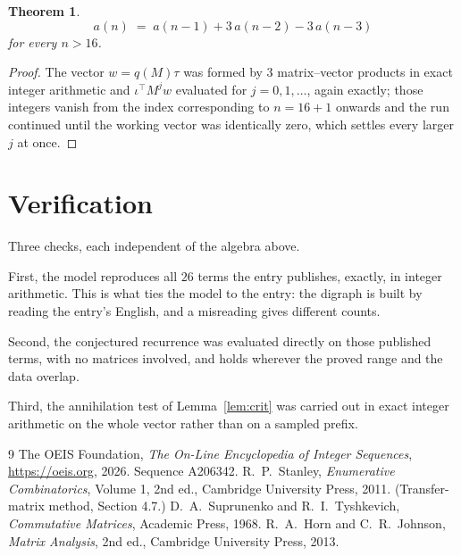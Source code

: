 \documentclass[11pt,a4paper]{article}
\theoremstyle{plain}
\newtheorem{theorem}{Theorem}
\theoremstyle{definition}
\begin{document}
\begin{theorem}
\[
a(n)\;=\;a(n-1) + 3\,a(n-2) - 3\,a(n-3)
\]
for every $n>16$.
\end{theorem}

\begin{proof}
The vector $w=q(M)\tau$ was formed by $3$ matrix--vector products in exact integer
arithmetic and $\iota^{\!\top}M^{j}w$ evaluated for $j=0,1,\dots$, again exactly; those
integers vanish from the index corresponding to $n=16+1$ onwards and the run continued
until the working vector was identically zero, which settles every larger $j$ at once.
\end{proof}

\section{Verification}

Three checks, each independent of the algebra above.

First, the model reproduces all $26$ terms the entry publishes, exactly, in integer
arithmetic. This is what ties the model to the entry: the digraph is built by reading the
entry's English, and a misreading gives different counts.

Second, the conjectured recurrence was evaluated directly on those published terms, with no
matrices involved, and holds wherever the proved range and the data overlap.

Third, the annihilation test of Lemma~\ref{lem:crit} was carried out in exact integer
arithmetic on the whole vector rather than on a sampled prefix.

\begin{thebibliography}{9}
 The OEIS Foundation, \emph{The On-Line Encyclopedia of Integer
Sequences}, \url{https://oeis.org}, 2026. Sequence A206342.
 R.~P.~Stanley, \emph{Enumerative Combinatorics}, Volume 1, 2nd ed.,
Cambridge University Press, 2011. (Transfer-matrix method, Section 4.7.)
 D.~A.~Suprunenko and R.~I.~Tyshkevich, \emph{Commutative Matrices},
Academic Press, 1968.
 R.~A.~Horn and C.~R.~Johnson, \emph{Matrix Analysis}, 2nd ed., Cambridge
University Press, 2013.
\end{thebibliography}
\end{document}

